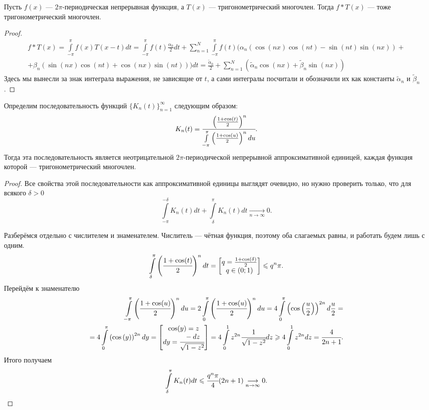 \begin{Lemma}
	Пусть $f(x)$ --- $2\pi$-периодическая непрерывная функция, а $T(x)$ --- тригонометрический многочлен. Тогда $f*T(x)$ --- тоже тригонометрический многочлен.
\end{Lemma}
\begin{proof}
	\begin{align*}
	f*T(x) = \int \limits_{-\pi}^{\pi}f(x)T(x - t)dt = \int \limits_{-\pi}^{\pi}f(t)\frac{\alpha_0}{2}dt +\sum\limits_{n=1}^{N} \int \limits_{-\pi}^{\pi}f(t)(\alpha_n(\cos(nx)\cos(nt) - \sin(nt)\sin(nx)) +\\+ \beta_n(\sin(nx)\cos(nt) + \cos(nx)\sin(nt)))dt = \frac{\widetilde{\alpha}_0}{2} + \sum \limits_{n=1}^{N}\left(\widetilde{\alpha}_n\cos(nx) + \widetilde{\beta}_n\sin(nx)\right)
	\end{align*}
	Здесь мы вынесли за знак интеграла выражения, не зависящие от $t$, а сами интегралы посчитали и обозначили их как константы $\widetilde{\alpha}_n$ и $\widetilde{\beta}_n$.
\end{proof}
\begin{Lemma}
	Определим последовательность функций $\{K_n(t)\}_{n=1}^{\infty}$ следующим образом:
	$$
		K_n(t) = \cfrac{\left(\frac{1+\cos(t)}{2}\right)^n}{\int\limits_{-\pi}^{\pi} \left(\frac{1 + \cos(u)}{2}\right)^ndu}.
	$$
	Тогда эта последовательность является неотрицательной $2\pi$-периодической непрерывной аппроксимативной единицей, каждая функция которой --- тригонометрический многочлен. 
\end{Lemma}
\begin{proof}
	Все свойства этой последовательности как аппроксимативной единицы выглядят очевидно, но нужно проверить только, что для всякого $\delta > 0$
	$$
		\int\limits_{-\pi}^{-\delta}K_n(t) dt + \int\limits_{\delta}^{\pi}K_n(t) dt \underset{n\to \infty}{\longrightarrow} 0.
	$$

Разберёмся отдельно с числителем и знаменателем.
Числитель --- чётная функция, поэтому оба слагаемых равны, и работать будем лишь с одним.
$$
	\int\limits_{\delta}^{\pi}\left(\cfrac{1 + \cos(t)}{2}\right)^n dt = \begin{bmatrix} q = \frac{1 + \cos(\delta)}{2}\\
	q \in (0;1)
	\end{bmatrix} \leqslant q^n\pi.
$$
Перейдём к знаменателю
\begin{align*}
	\int\limits_{-\pi}^{\pi} \left(\cfrac{1 + \cos(u)}{2}\right)^n du = 2\int\limits_{0}^{\pi} \left(\cfrac{1 + \cos(u)}{2}\right)^n du = 4 \int\limits_{0}^{\pi} \left(\cos\left(\frac{u}{2}\right)\right)^{2n} d\frac{u}{2} = \\ =
	4 \int\limits_{0}^{\pi} \left(\cos\left(y\right)\right)^{2n} dy = \begin{bmatrix}
		\cos(y) = z\\
		dy = \cfrac{-dz}{\sqrt{1 - z^2}}
		\end{bmatrix} = 4 \int\limits_{0}^{1} z^{2n} \cfrac{1}{\sqrt{1-z^2}}dz \geqslant 4\int\limits_{0}^{1} z^{2n}dz = \cfrac{4}{2n+1}.
\end{align*}
Итого получаем
$$
	\int\limits_{\delta}^{\pi}K_n(t) dt \leqslant \cfrac{q^n\pi}{4}(2n+1) \underset{n \to \infty}{\longrightarrow} 0.
$$
\end{proof}
